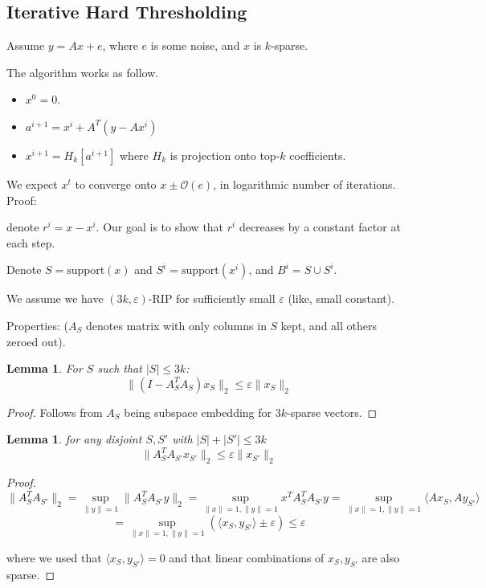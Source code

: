 \documentclass[11pt]{article}
\newtheorem{lemma}[theorem]{Lemma}
\newcommand{\bigo}{\mathcal{O}}
\begin{document}
\subsection{Iterative Hard Thresholding}

Assume $y = Ax+e$, where $e$ is some noise, and $x$ is $k$-sparse.

The algorithm works as follow. 
\begin{itemize}
\item $x^0 = 0$.
\item $a^{i+1} = x^i + A^T(y - Ax^i)$
\item $x^{i+1} = H_k[a^{i+1}]$ where $H_k$ is projection onto top-$k$ coefficients.
\end{itemize}

We expect $x^t$ to converge onto $x \pm \bigo(e)$, in logarithmic number of iterations.
Proof:

denote $r^i = x - x^i$.  Our goal is to show that $r^i$ decreases by a constant factor at each step.

Denote $S = \text{support}(x)$ and $S^i = \text{support}(x^i)$, and $B^i = S \cup S^i$.

We assume we have $(3k,\varepsilon)$-RIP for sufficiently small $\varepsilon$ (like, small constant).

Properties: ($A_S$ denotes matrix with only columns in $S$ kept, and all others zeroed out).
\begin{lemma}
For $S$ such that $|S| \le 3k$:
$$\|(I - A_S^T A_S)x_S\|_2 \le \varepsilon \|x_S\|_2$$
\end{lemma}
\begin{proof}
Follows from $A_S$ being subspace embedding for $3k$-sparse vectors.
\end{proof}

\begin{lemma}
for any disjoint $S,S'$ with $|S|+|S'| \le 3k$
$$\|A_S^TA_{S'}x_{S'}\|_2 \le \varepsilon \|x_{S'}\|_2$$
\end{lemma}
\begin{proof}
$$\|A_S^T A_{S'}\|_2 = \sup_{\|y\|=1} \|A_S^T A_{S'} y\|_2 = \sup_{\|x\|=1,\|y\|=1} x^T A_S^T A_{S'} y =  \sup_{\|x\|=1,\|y\|=1} \langle A x_S , A y_{S'} \rangle $$
$$=  \sup_{\|x\|=1,\|y\|=1} ( \langle x_S ,  y_{S'} \rangle \pm \varepsilon ) \le \varepsilon$$

where we used that $\langle x_S, y_{S'} \rangle = 0$ and that linear combinations of $x_S,y_{S'}$ are also sparse.
\end{proof}
\end{document}
